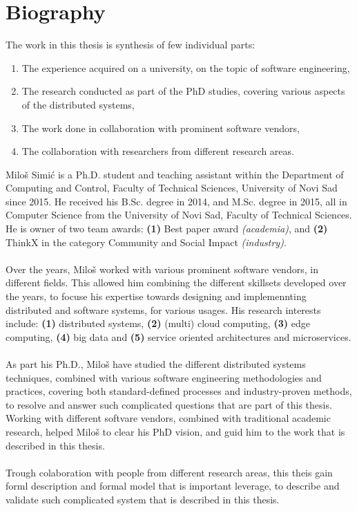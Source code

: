 \chapter*{Biography}
%
The work in this thesis is synthesis of few individual parts:

\begin{enumerate}[start=1,label={(\bfseries \arabic*)}]
	\item The experience acquired on a university, on the topic of software engineering,
	\item The research conducted as part of the PhD studies, covering various aspects of the distributed systems,
	\item The work done in collaboration with prominent software vendors,
	\item The collaboration with researchers from different research areas.
\end{enumerate}

\noindent
Milo\v s Simi\'c is a Ph.D. student and teaching assistant within the Department of Computing and Control, Faculty of Technical Sciences, University of Novi Sad since 2015. He received his B.Sc. degree in 2014, and M.Sc. degree in 2015, all in Computer Science from the University of Novi Sad, Faculty of Technical Sciences. He is owner of two team awards: \textbf{(1)} Best paper award \emph{(academia)}, and \textbf{(2)} ThinkX in the category Community and Social Impact \emph{(industry)}.\\\\ 
\noindent
Over the years, Milo\v s worked with various prominent software vendors, in different fields. This allowed him combining the different skillsets developed over the years, to focuse his expertise towards designing and implemennting distributed and software systems, for various usages. His research interests include: \textbf{(1)} distributed systems, \textbf{(2)} (multi) cloud computing, \textbf{(3)} edge computing, \textbf{(4)} big data and \textbf{(5)} service oriented architectures and microservices.\\\\
\noindent
As part his Ph.D., Milo\v s have studied the different distributed systems techniques, combined with various software engineering methodologies and practices, covering both standard-defined processes and industry-proven methods, to resolve and answer such complicated questions that are part of this thesis. Working with different softvare vendors, combined with traditional academic research, helped Milo\v s to clear his PhD vision, and guid him to the work that is described in this thesis.\\\\
\noindent
Trough colaboration with people from different research areas, this theis gain forml description and formal model that is important leverage, to describe and validate such complicated system that is described in this thesis.
%
%